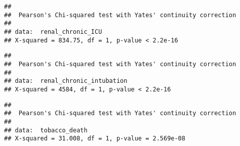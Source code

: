 \documentclass[
]{article}
\newenvironment{Shaded}{\begin{snugshade}}{\end{snugshade}}
\newcommand{\CommentTok}[1]{\textcolor[rgb]{0.56,0.35,0.01}{\textit{#1}}}
\newcommand{\FunctionTok}[1]{\textcolor[rgb]{0.00,0.00,0.00}{#1}}
\newcommand{\NormalTok}[1]{#1}
\newcommand{\OtherTok}[1]{\textcolor[rgb]{0.56,0.35,0.01}{#1}}
\newcommand{\SpecialCharTok}[1]{\textcolor[rgb]{0.00,0.00,0.00}{#1}}
\begin{document}
\begin{Shaded}
\end{Shaded}

\begin{verbatim}
## 
##  Pearson's Chi-squared test with Yates' continuity correction
## 
## data:  renal_chronic_ICU
## X-squared = 834.75, df = 1, p-value < 2.2e-16
\end{verbatim}

\begin{Shaded}
\end{Shaded}

\begin{verbatim}
## 
##  Pearson's Chi-squared test with Yates' continuity correction
## 
## data:  renal_chronic_intubation
## X-squared = 4584, df = 1, p-value < 2.2e-16
\end{verbatim}

\begin{Shaded}
\end{Shaded}

\begin{verbatim}
## 
##  Pearson's Chi-squared test with Yates' continuity correction
## 
## data:  tobacco_death
## X-squared = 31.008, df = 1, p-value = 2.569e-08
\end{verbatim}
\end{document}
